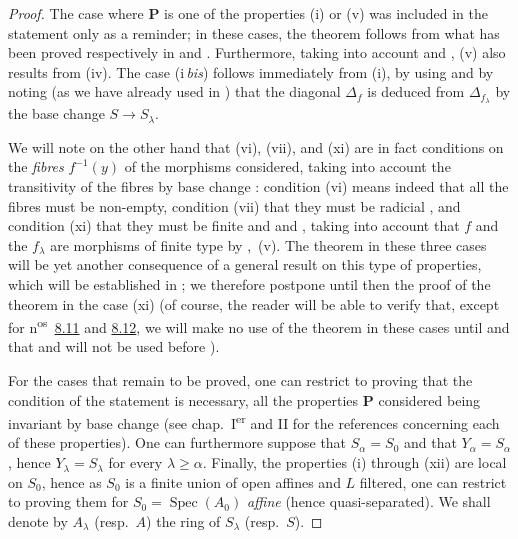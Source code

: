 \begin{proof}
The case where $\boldsymbol{P}$ is one of the properties (i) or (v) was included in the statement only as a reminder; in these cases, the theorem follows from what has been proved respectively in  and .
Furthermore, taking into account  and , (v) also results from (iv).
The case (i\,\emph{bis}) follows immediately from (i), by using  and by noting (as we have already used in ) that the diagonal $\Delta_f$ is deduced from $\Delta_{f_\lambda}$ by the base change $S\to S_\lambda$.

We will note on the other hand that (vi), (vii), and (xi) are in fact conditions on the \emph{fibres} $f^{-1}(y)$ of the morphisms considered, taking into account the transitivity of the fibres by base change : condition (vi) means indeed that all the fibres must be non-empty, condition (vii) that they must be radicial , and condition (xi) that they must be finite  and  and , taking into account that $f$ and the $f_\lambda$ are morphisms of finite type by ,~(v).
The theorem in these three cases will be yet another consequence of a general result on this type of properties, which will be established in ; we therefore postpone until then the proof of the theorem in the case (xi) (of course, the reader will be able to verify that, except for n\textsuperscript{os}~{\hyperref[IV.8.11]{8.11}} and {\hyperref[IV.8.12]{8.12}}, we will make no use of the theorem in these cases until  and that  and  will not be used before ).

For the cases that remain to be proved, one can restrict to proving that the condition of the statement is necessary, all the properties $\boldsymbol{P}$ considered being invariant by base change (see chap.~I\textsuperscript{er} and II for the references concerning each of these properties).
One can furthermore suppose that $S_\alpha=S_0$ and that $Y_\alpha=S_\alpha$, hence $Y_\lambda=S_\lambda$ for every $\lambda\geqslant\alpha$.
Finally, the properties (i) through (xii) are local on $S_0$, hence as $S_0$ is a finite union of open affines and $L$ filtered, one can restrict to proving them for $S_0=\operatorname{Spec}(A_0)$ \emph{affine} (hence quasi-separated).
We shall denote by $A_\lambda$ (resp.\ $A$) the ring of $S_\lambda$ (resp.\ $S$).


\end{proof}
